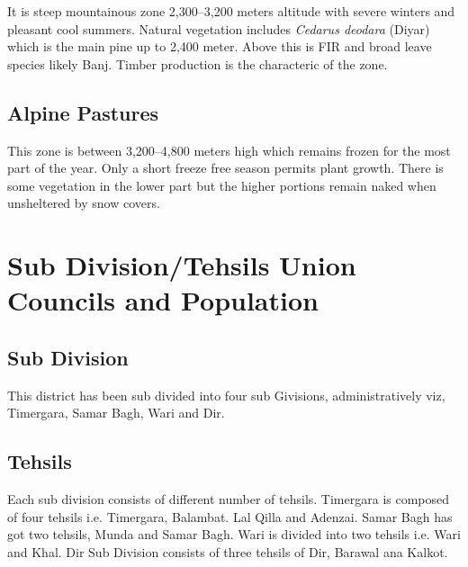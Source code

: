\documentclass[twoside,openright]{book}
\begin{document}
It is steep mountainous zone 2,300--3,200 meters altitude with severe winters
and pleasant cool summers. Natural vegetation includes \emph{Cedarus deodara}
(Diyar) which is the main pine up to 2,400 meter. Above this is FIR and broad
leave species likely Banj. Timber production is the characteric of the zone.

\subsection{Alpine Pastures}

This zone is between 3,200--4,800 meters high which remains frozen for the most
part of the year. Only a short freeze free season permits plant growth. There is
some vegetation in the lower part but the higher portions remain naked when
unsheltered by snow covers.

\section{Sub Division/Tehsils Union Councils and Population}

\subsection{Sub Division}

This district has been sub divided into four sub Givisions, administratively
viz, Timergara, Samar Bagh, Wari and Dir.

\subsection{Tehsils}

Each sub division consists of different number of tehsils. Timergara is composed
of four tehsils i.e. Timergara, Balambat. Lal Qilla and Adenzai. Samar Bagh has
got two tehsils, Munda and Samar Bagh. Wari is divided into two tehsils i.e.
Wari and Khal. Dir Sub Division consists of three tehsils of Dir, Barawal ana
Kalkot.

\vspace{5mm}

\end{document}

